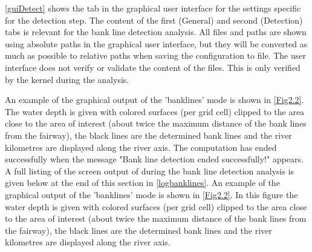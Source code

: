 \autoref{guiDetect} shows the tab in the graphical user interface for the settings specific for the detection step.
The content of the first (General) and second (Detection) tabs is relevant for the bank line detection analysis.
All files and paths are shown using absolute paths in the graphical user interface, but they will be converted as much as possible to relative paths when saving the configuration to file.
The user interface does not verify or validate the content of the files.
This is only verified by the kernel during the analysis.

An example of the graphical output of the 'banklines' mode is shown in \autoref{Fig2.2}.
The water depth is given with colored surfaces (per grid cell) clipped to the area close to the area of interest (about twice the maximum distance of the bank lines from the fairway), the black lines are the determined bank lines and the river kilometres are displayed along the river axis.
The computation has ended successfully when the message "Bank line detection ended successfully!" appears.
A full listing of the screen output of \dfastbe during the bank line detection analysis is given below at the end of this section in \autoref{logbanklines}. An example of the graphical output of the 'banklines' mode is shown in \autoref{Fig2.2}. In this figure the water depth is given with colored surfaces (per grid cell) clipped to the area close to the area of interest (about twice the maximum distance of the bank lines from the fairway), the black lines are the determined bank lines and the river kilometres are displayed along the river axis. 





